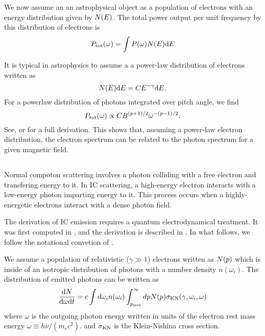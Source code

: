 We now assume an an astrophysical object
as a population of electrons with an energy
distribution given by $N(E)$.
The total power output per unit frequency by this distribution
of electrons is
\begin{equation}
P_\text{tot}(\omega) = 
\int P(\omega) N(E) \text{d}E 
\end{equation}

It is typical in astrophysics to assume a 
a power-law distribution of electrons written as
\begin{equation}
\eqnlabel{ElectronPowerLawEnergyDistribution}
  \ParticleDistribution(\energy) \denergy = C \energy^{-\spectralindex} \denergy.
\end{equation}
For a powerlaw distribution of photons integrated over
pitch angle, we find 
\begin{equation}
P_\text{tot}(\omega) \propto C B^{(p+1)/2} 
\omega^{-(p-1)/2}.
\end{equation}
See, \cite{rybicki_1979a_radiative-processes} 
or \cite{longair_2013a_energy-astrophysics} for a full derivation.
This shows that, assuming a power-law electron distribution,
the electron spectrum can be related to the photon spectrum 
for a given magnetic field.

\subsection{}

Normal compoton scattering involves a photon colliding with a free electron
and transfering energy to it. In \ac{IC} scattering, a high-energy 
electron interacts with a low-energy photon imparting energy to it.
This process occurs when a highly-energetic electrons interact with
a dense photon field.

The derivation of \Ac{IC} emission requires a quantum
electrodynamical treatment. It was first computed in
\cite{klein_1929a_streuung-strahlung}, and the derivation is described
in \cite{blumenthal_1970a_bremsstrahlung-synchrotron}.  In what follows, we follow
the notational convetion of \cite{houck_2006a_models-nonthermal}.

We assume a population of relativistic ($\gamma\gg1$) electrons
written as $N(p)$ which is inside of an isotropic distribution
of photons with a number density $n(\omega_i)$.
The distribution of emitted photons can be written as
\begin{equation}
  \frac{\text{d}N}{\text{d}\omega\text{d}t} = 
  c \int d \omega_i n(\omega_i)
  \int_{p_\text{min}}^\infty  dp
  N(p) 
 \sigma_\text{KN}(\gamma,\omega_i,\omega)
\end{equation}
where $\omega$ is the outgoing photon energy written
in units of the electron rest mass energy $\omega\equiv h\nu/(m_e c^2)$.
and $\sigma_\text{KN}$ is the Klein-Nishina cross section.

